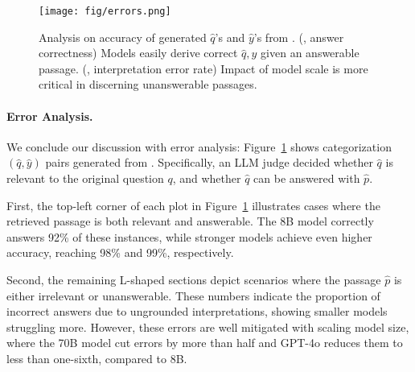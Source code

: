 \begin{figure}[tbp]
\centering
\texttt{[image: fig/errors.png]}
\caption{
Analysis on accuracy of generated $\hat{q}$'s and $\hat{y}$'s from \ours.
(, answer correctness) Models easily derive correct $\hat{q}, \hat{y}$ given an answerable passage. (, interpretation error rate) Impact of model scale is more critical in discerning unanswerable passages.
}
\label{fig:error_types}
\end{figure}

\paragraph{Error Analysis.}
We conclude our discussion with error analysis:
Figure~\ref{fig:error_types} shows categorization $(\hat{q}, \hat{y})$ pairs generated from \ours.
Specifically, an LLM judge decided whether $\hat{q}$ is relevant to the original question $q$, and whether $\hat{q}$ can be answered with $\hat{p}$.

First, the top-left corner of each plot in Figure~\ref{fig:error_types} illustrates cases where the retrieved passage is both relevant and answerable. The 8B model correctly answers 92\% of these instances, while stronger models achieve even higher accuracy, reaching 98\% and 99\%, respectively.

Second, the remaining L-shaped sections depict scenarios where the passage $\hat{p}$ is either irrelevant or unanswerable.
These numbers indicate the proportion of incorrect answers due to ungrounded interpretations, showing smaller models struggling more.
However, these errors are well mitigated with scaling model size,
where the 70B model cut errors by more than half and GPT-4o reduces them to less than one-sixth, compared to 8B.


